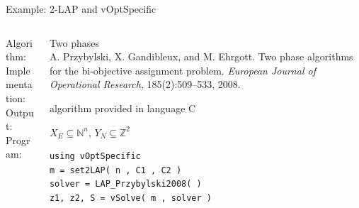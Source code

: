 \documentclass[10pt,xcolor=dvipsnames]{beamer}
\newcommand{\mN}{\mathbb{N}}
\newcommand{\Z}{\mathbb{Z}}
\begin{document}
\begin{frame}[fragile=singleslide]{Example: 2-LAP and vOptSpecific}

\vspace{5mm}
\begin{columns}
%
\begin{column}{0.2\textwidth}
Algorithm: \\
\vspace{15mm}
Implementation:\\  
\vspace{2mm}
Output: \\
\vspace{8mm}
Program:
\vspace{11mm}
\end{column}
\begin{column}{0.8\textwidth}
         Two phases  \vspace{1mm}\\
         {\footnotesize A. Przybylski, X. Gandibleux, and M. Ehrgott. Two phase algorithms for the bi-objective assignment problem.
         \textit{European Journal of Operational Research}, 185(2):509--533, 2008.\\}
\medskip

         algorithm provided in language C
\medskip

$X_E \subseteq \mN^n$, $Y_N \subseteq \Z^2$
\vspace{5mm}

{\footnotesize
\begin{verbatim}
using vOptSpecific   
m = set2LAP( n , C1 , C2 )
solver = LAP_Przybylski2008( ) 
z1, z2, S = vSolve( m , solver ) 
\end{verbatim}
}          
\end{column}
%
\end{columns}         

\end{frame}
\end{document}
